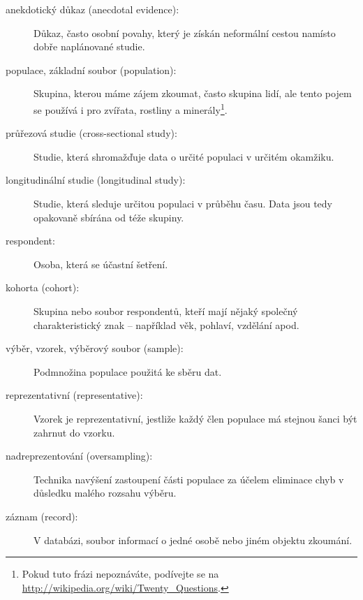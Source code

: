 \documentclass[12pt]{book}
\begin{document}
\begin{description}

\item[anekdotický důkaz (anecdotal evidence):] Důkaz, často osobní povahy, který je získán neformální cestou namísto dobře naplánované studie.

\item[populace, základní soubor (population):] Skupina, kterou máme zájem zkoumat, často skupina lidí, ale tento pojem se používá i pro zvířata, rostliny a minerály\footnote{Pokud tuto frázi nepoznáváte, podívejte se na    \url{http://wikipedia.org/wiki/Twenty_Questions}.}.

\item[průřezová studie (cross-sectional study):] Studie, která shromažďuje data o určité populaci v určitém okamžiku.

\item[longitudinální studie (longitudinal study):] Studie, která sleduje určitou populaci v průběhu času. Data jsou tedy opakovaně sbírána od téže skupiny.

\item[respondent:] Osoba, která se účastní šetření.

\item[kohorta (cohort):] Skupina nebo soubor respondentů, kteří mají nějaký společný charakteristický znak – například věk, pohlaví, vzdělání apod.


\item[výběr, vzorek, výběrový soubor (sample):] Podmnožina populace použitá ke sběru dat.

\item[reprezentativní (representative):] Vzorek je reprezentativní, jestliže každý člen populace má stejnou šanci být zahrnut do vzorku.

\item[nadreprezentování (oversampling):] Technika navýšení zastoupení části populace za účelem eliminace chyb v důsledku malého rozsahu výběru.

\item[záznam (record):] V databázi, soubor informací o jedné osobě nebo jiném objektu zkoumání.


\end{description}
\end{document}
